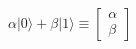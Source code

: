 \documentclass[preview]{standalone}
\begin{document}
\begin{align*}
\alpha|0\rangle + \beta|1\rangle \equiv \begin{bmatrix} \alpha \\ \beta \end{bmatrix}
\end{align*}
\end{document}
